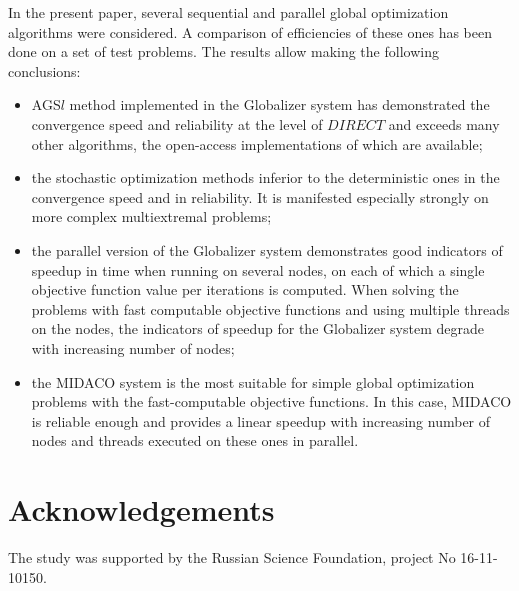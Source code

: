 \documentclass{svproc}
\begin{document}
In the present paper, several sequential and parallel global optimization algorithms were considered.
A comparison of efficiencies of these ones has been done on a set of test problems. The results allow
making the following conclusions:
\begin{itemize}
  \item AGS\(l\) method implemented in the Globalizer system has demonstrated the convergence
speed and reliability at the level of \(DIRECT\) and exceeds many other algorithms, the open-access
implementations of which are available;
  \item the stochastic optimization methods inferior to the deterministic ones in the convergence
speed and in reliability. It is manifested especially strongly on more complex multiextremal
problems;
  \item the parallel version of the Globalizer system demonstrates good indicators of speedup in time
when running on several nodes, on each of which a single objective function value per iterations is
computed. When solving the problems with fast computable objective functions and using multiple
threads on the nodes, the indicators of speedup for the Globalizer system degrade with increasing
number of nodes;
  \item the MIDACO system is the most suitable for simple global optimization problems with the
fast-computable objective functions. In this case, MIDACO is reliable enough and provides a linear
speedup with increasing number of nodes and threads executed on these ones in parallel.
\end{itemize}


\section*{Acknowledgements}
The study was supported by the Russian Science Foundation, project No 16-11-
10150.

%

{}
\end{document}
